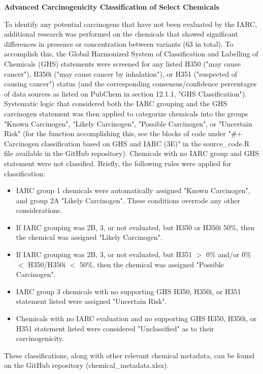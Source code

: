 \vspace{1em}

\noindent\textbf{Advanced Carcinogenicity Classification of Select Chemicals}

To identify any potential carcinogens that have not been evaluated by the IARC, additional research was performed on the chemicals that showed significant differences in presence or concentration between variants (63 in total). 
To accomplish this, the Global Harmonized System of Classification and Labelling of Chemicals (GHS) statements were screened for any listed H350 ("may cause cancer"), H350i ("may cause cancer by inhalation"), or H351 ("suspected of causing cancer") status (and the corresponding consensus/confidence percentages of data sources as listed on PubChem in section 12.1.1, "GHS Classification"). 
Systematic logic that considered both the IARC grouping and the GHS carcinogen statement was then applied to categorize chemicals into the groups "Known Carcinogen", "Likely Carcinogen", "Possible Carcinogen", or "Uncertain Risk" (for the function accomplishing this, see the blocks of code under "\#+ Carcinogen classification based on GHS and IARC (3E)" in the source\_code.R file available in the GitHub repository). 
Chemicals with no IARC group and GHS statement were not classified. 
Briefly, the following rules were applied for classification:

\begin{itemize}
\item IARC group 1 chemicals were automatically assigned "Known Carcinogen", and group 2A "Likely Carcinogen". These conditions overrode any other considerations.
\item If IARC grouping was 2B, 3, or not evaluated, but H350 or H350i 50\%, then the chemical was assigned "Likely Carcinogen".
\item If IARC grouping was 2B, 3, or not evaluated, but H351 $>$ 0\% and/or 0\% $<$ H350/H350i $<$ 50\%, then the chemical was assigned "Possible Carcinogen".
\item IARC group 3 chemicals with no supporting GHS H350, H350i, or H351 statement listed were assigned "Uncertain Risk".
\item Chemicals with no IARC evaluation and no supporting GHS H350, H350i, or H351 statement listed were considered "Unclassified" as to their carcinogenicity.
\end{itemize}

These classifications, along with other relevant chemical metadata, can be found on the GitHub repository (chemical\_metadata.xlsx).

